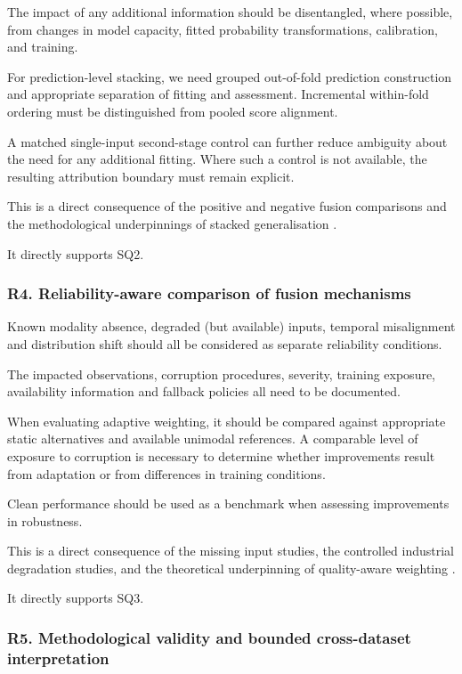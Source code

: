 The impact of any additional information should be disentangled, where possible, from changes in
model capacity, fitted probability transformations, calibration, and training.

For prediction-level stacking, we need grouped out-of-fold prediction construction and appropriate
separation of fitting and assessment. Incremental within-fold ordering must be distinguished from
pooled score alignment.

A matched single-input second-stage control can further reduce ambiguity about the need for any
additional fitting. Where such a control is not available, the resulting attribution boundary must
remain explicit.

This is a direct consequence of the positive and negative fusion comparisons and the methodological
underpinnings of stacked generalisation
\parencite{Hua2026Weld,Thoduka2024Handover,Wang2020What,Ting1999Issues}.

It directly supports SQ2.

\subsubsection*{R4. Reliability-aware comparison of fusion mechanisms}

Known modality absence, degraded (but available) inputs, temporal misalignment and distribution
shift should all be considered as separate reliability conditions.

The impacted observations, corruption procedures, severity, training exposure, availability
information and fallback policies all need to be documented.

When evaluating adaptive weighting, it should be compared against appropriate static alternatives
and available unimodal references. A comparable level of exposure to corruption is necessary to
determine whether improvements result from adaptation or from differences in training conditions.

Clean performance should be used as a benchmark when assessing improvements in robustness.

This is a direct consequence of the missing input studies, the controlled industrial degradation
studies, and the theoretical underpinning of quality-aware weighting
\parencite{Huo2022Multisensor,Altinses2023Fuzzy,P026,Zhang2023QMF}.

It directly supports SQ3.

\subsubsection*{R5. Methodological validity and bounded cross-dataset interpretation}

